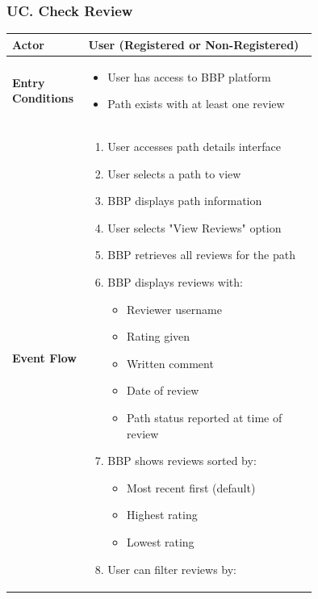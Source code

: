 \subsubsection*{UC\cuc . Check Review}
\begin{center}
    \begin{longtable}{|l|p{0.75\linewidth}|}
        \hline
        \textbf{Actor}            & User (Registered or Non-Registered) \\
        \hline
        \textbf{Entry Conditions} & 
        \begin{itemize}
            \item User has access to BBP platform
            \item Path exists with at least one review
        \end{itemize} \\
        \hline
        \textbf{Event Flow}       & 
        \begin{enumerate}
            \item User accesses path details interface
            \item User selects a path to view
            \item BBP displays path information
            \item User selects "View Reviews" option
            \item BBP retrieves all reviews for the path
            \item BBP displays reviews with:
            \begin{itemize}
                \item Reviewer username
                \item Rating given
                \item Written comment
                \item Date of review
                \item Path status reported at time of review
            \end{itemize}
            \item BBP shows reviews sorted by:
            \begin{itemize}
                \item Most recent first (default)
                \item Highest rating
                \item Lowest rating
            \end{itemize}
            \item User can filter reviews by:

\end{enumerate}
\end{longtable}
\end{center}
